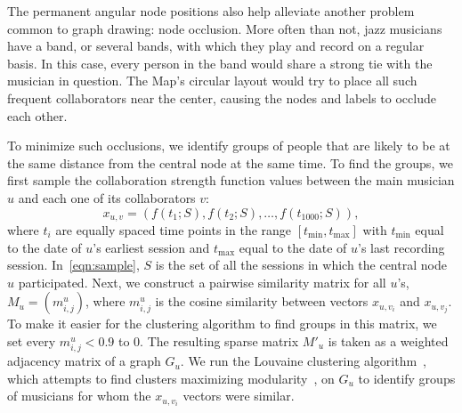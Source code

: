 \documentclass[12pt]{cmuthesis}
\begin{document}
  The permanent angular node positions also help alleviate another problem common
  to graph drawing: node occlusion. More often than not, jazz musicians have a
  band, or several bands, with which they play and record on a regular basis. In
  this case, every person in the band would share a strong tie with the musician
  in question. The Map's circular layout would try to place all such frequent
  collaborators near the center, causing the nodes and labels to occlude each
  other.

  To minimize such occlusions, we identify groups of people that are likely to be
  at the same distance from the central node at the same time. To find the groups,
  we first sample the collaboration strength function values between the main
  musician $u$ and each one of its collaborators $v$:
  \begin{equation}\label{eqn:sample}
    x_{u, v} = (f(t_1;S), f(t_2;S), \ldots, f(t_{1000};S)),
  \end{equation}
  where $t_i$ are equally spaced time points in the range $[t_\textrm{min}, t_\textrm{max}]$ with $t_\textrm{min}$ equal to the date of $u$'s earliest session and $t_\textrm{max}$ equal to the date of $u$'s last recording session. In~\eqref{eqn:sample}, $S$ is the set of all the sessions in which the central node $u$ participated. Next, we construct a pairwise similarity matrix for all $u$'s, $M_u = \left(m^u_{i,j}\right)$, where $m^u_{i, j}$ is the cosine similarity between vectors $x_{u,v_i}$ and $x_{u,v_j}$. To make it easier for the clustering algorithm to find groups in this matrix, we set every $m^u_{i,j} < 0.9$ to $0$. The resulting sparse matrix $M'_u$ is taken as a weighted adjacency matrix of a graph $G_u$. We run the Louvaine clustering algorithm~\cite{Blondel2008}, which attempts to find clusters maximizing modularity~\cite{newman06}, on $G_u$ to identify groups of musicians for whom the $x_{u, v_i}$ vectors were similar.
\end{document}

